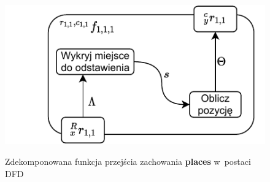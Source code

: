 \begin{figure}
    \centering
    \includegraphics[width=\columnwidth]{figures/ISR-vr-camera-fp-places.pdf}
    \label{fig:vr-camera-fp-places}
    \caption{Zdekomponowana funkcja przejścia zachowania \textbf{places} w~postaci DFD}
\end{figure}